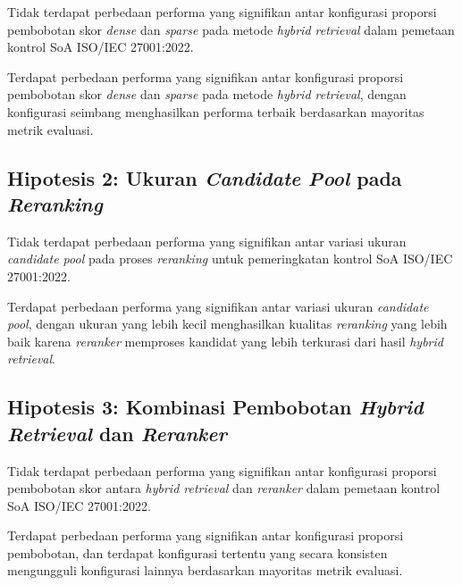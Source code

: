 \begin{description}[leftmargin=3.2em, labelwidth=3.0em, labelsep=0.2em, font=\normalfont]
	\item[$H_0$:] Tidak terdapat perbedaan performa yang signifikan antar konfigurasi proporsi pembobotan skor \textit{dense} dan \textit{sparse} pada metode \textit{hybrid retrieval} dalam pemetaan kontrol SoA ISO/IEC 27001:2022.
	\item[$H_1$:] Terdapat perbedaan performa yang signifikan antar konfigurasi proporsi pembobotan skor \textit{dense} dan \textit{sparse} pada metode \textit{hybrid retrieval}, dengan konfigurasi seimbang menghasilkan performa terbaik berdasarkan mayoritas metrik evaluasi.
\end{description}

\subsection*{Hipotesis 2: Ukuran \textit{Candidate Pool} pada \textit{Reranking}}

\begin{description}[leftmargin=3.2em, labelwidth=3.0em, labelsep=0.2em, font=\normalfont]
	\item[$H_0$:] Tidak terdapat perbedaan performa yang signifikan antar variasi ukuran \textit{candidate pool} pada proses \textit{reranking} untuk pemeringkatan kontrol SoA ISO/IEC 27001:2022.
	\item[$H_1$:] Terdapat perbedaan performa yang signifikan antar variasi ukuran \textit{candidate pool}, dengan ukuran yang lebih kecil menghasilkan kualitas \textit{reranking} yang lebih baik karena \textit{reranker} memproses kandidat yang lebih terkurasi dari hasil \textit{hybrid retrieval}.
\end{description}

\subsection*{Hipotesis 3: Kombinasi Pembobotan \textit{Hybrid Retrieval} dan \textit{Reranker}}

\begin{description}[leftmargin=3.2em, labelwidth=3.0em, labelsep=0.2em, font=\normalfont]
	\item[$H_0$:] Tidak terdapat perbedaan performa yang signifikan antar konfigurasi proporsi pembobotan skor antara \textit{hybrid retrieval} dan \textit{reranker} dalam pemetaan kontrol SoA ISO/IEC 27001:2022.
	\item[$H_1$:] Terdapat perbedaan performa yang signifikan antar konfigurasi proporsi pembobotan, dan terdapat konfigurasi tertentu yang secara konsisten mengungguli konfigurasi lainnya berdasarkan mayoritas metrik evaluasi.
\end{description}


